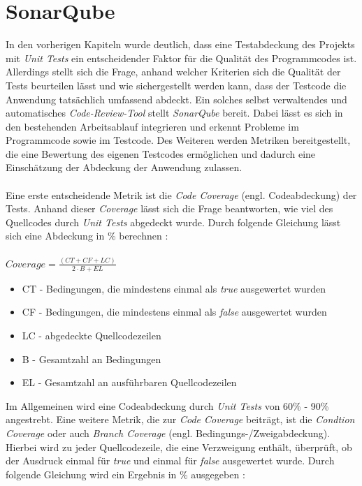 \section{SonarQube}
In den vorherigen Kapiteln wurde deutlich, dass eine Testabdeckung des Projekts mit \textit{Unit Tests} ein entscheidender Faktor für die Qualität des Programmcodes ist. Allerdings stellt sich die Frage, anhand welcher Kriterien sich die Qualität der Tests beurteilen lässt und wie sichergestellt werden kann, dass der Testcode die Anwendung tatsächlich umfassend abdeckt. Ein solches selbst verwaltendes und automatisches \textit{Code-Review-Tool} stellt \textit{SonarQube} bereit. Dabei lässt es sich in den bestehenden Arbeitsablauf integrieren und erkennt Probleme im Programmcode sowie im Testcode. \cite*{SonarQube10} Des Weiteren werden Metriken bereitgestellt, die eine Bewertung des eigenen Testcodes ermöglichen und dadurch eine Einschätzung der Abdeckung der Anwendung zulassen.\\\\
Eine erste entscheidende Metrik ist die \textit{Code Coverage} (engl. Codeabdeckung) der Tests. Anhand dieser \textit{Coverage} lässt sich die Frage beantworten, wie viel des Quellcodes durch \textit{Unit Tests} abgedeckt wurde. Durch folgende Gleichung lässt sich eine Abdeckung in \% berechnen \cite*{MetricDefinition}:\\\\
$Coverage = \frac{(CT + CF + LC)}{2 \cdot B + EL}$
\begin{itemize}
    \setlength{\parskip}{1pt}
    \item CT - Bedingungen, die mindestens einmal als \textit{true} ausgewertet wurden
    \item CF - Bedingungen, die mindestens einmal als \textit{false} ausgewertet wurden
    \item LC - abgedeckte Quellcodezeilen
    \item B - Gesamtzahl an Bedingungen
    \item EL - Gesamtzahl an ausführbaren Quellcodezeilen
\end{itemize}
Im Allgemeinen wird eine Codeabdeckung durch \textit{Unit Tests} von 60\% - 90\% angestrebt. \cite*{WhatReasonableCode}
Eine weitere Metrik, die zur \textit{Code Coverage} beiträgt, ist die \textit{Condtion Coverage} oder auch \textit{Branch Coverage} (engl. Bedingungs-/Zweigabdeckung). Hierbei wird zu jeder Quellcodezeile, die eine Verzweigung enthält, überprüft, ob der Ausdruck einmal für \textit{true} und einmal für \textit{false} ausgewertet wurde. Durch folgende Gleichung wird ein Ergebnis in \% ausgegeben \cite*{MetricDefinition}:\\\\
